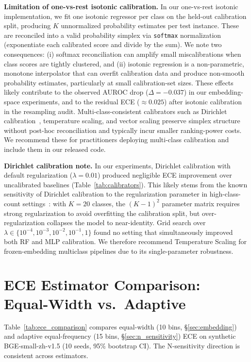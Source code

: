 \documentclass[11pt]{article}
\begin{document}
\textbf{Limitation of one-vs-rest isotonic calibration.} In our one-vs-rest isotonic implementation, we fit one isotonic regressor per class on the held-out calibration split, producing $K$ unnormalized probability estimates per test instance. These are reconciled into a valid probability simplex via \texttt{softmax} normalization (exponentiate each calibrated score and divide by the sum). We note two consequences: (i) softmax reconciliation can amplify small miscalibrations when class scores are tightly clustered, and (ii) isotonic regression is a non-parametric, monotone interpolator that can overfit calibration data and produce non-smooth probability estimates, particularly at small calibration-set sizes. These effects likely contribute to the observed AUROC drop ($\Delta = -0.037$) in our embedding-space experiments, and to the residual ECE ($\approx 0.025$) after isotonic calibration in the resampling audit. Multi-class-consistent calibrators such as Dirichlet calibration~\cite{kull2019dirichlet}, temperature scaling, and vector scaling preserve simplex structure without post-hoc reconciliation and typically incur smaller ranking-power costs. We recommend these for practitioners deploying multi-class calibration and include them in our released code.

\textbf{Dirichlet calibration note.} In our experiments, Dirichlet calibration with default regularization ($\lambda{=}0.01$) produced negligible ECE improvement over uncalibrated baselines (Table~\ref{tab:calibrators}). This likely stems from the known sensitivity of Dirichlet calibration to the regularization parameter in high-class-count settings~\cite{kull2019dirichlet}: with $K{=}20$ classes, the $(K-1)^2$ parameter matrix requires strong regularization to avoid overfitting the calibration split, but over-regularization collapses the model to near-identity. Grid search over $\lambda \in \{10^{-4}, 10^{-3}, 10^{-2}, 10^{-1}, 1\}$ found no setting that simultaneously improved both RF and MLP calibration. We therefore recommend Temperature Scaling for frozen-embedding multiclass pipelines due to its single-parameter robustness.

\section{ECE Estimator Comparison: Equal-Width vs.\ Adaptive}

Table~\ref{tab:ece_comparison} compares equal-width (10 bins, §\ref{sec:embedding}) and adaptive equal-frequency (15 bins, §\ref{sec:n_sensitivity}) ECE on synthetic BGE-small-zh-v1.5 (10 seeds, 95\% bootstrap CI). The N-sensitivity direction is consistent across estimators.
\end{document}
